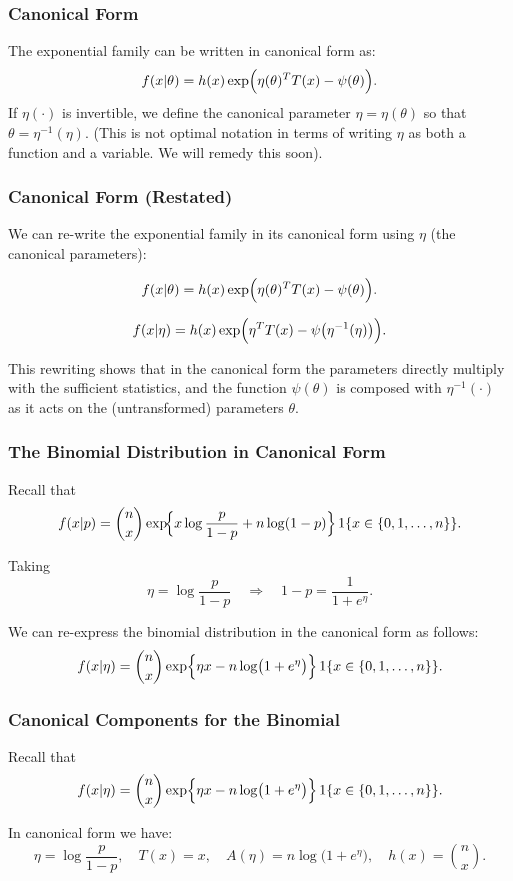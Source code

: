 \documentclass{beamer}
\begin{document}
\begin{frame}
\frametitle{Canonical Form}
The exponential family can be written in canonical form as:
\[
f(x|\theta) = h(x)\exp\Bigl(\eta(\theta)^T T(x) - \psi(\theta)\Bigr).
\]
If $\eta(\cdot)$ is invertible, we define the canonical parameter $\eta = \eta(\theta)$ so that $\theta = \eta^{-1}(\eta)$. (This is not optimal notation in terms of writing $\eta$ as both a function and a variable. We will remedy this soon). 

\end{frame}

\begin{frame}
\frametitle{Canonical Form (Restated)}

We can re-write the exponential family in its canonical form using $\eta$ (the canonical parameters):

\[
f(x|\theta) = h(x)\exp\Bigl(\eta(\theta)^T T(x) - \psi(\theta)\Bigr).
\]

\[
f(x|\eta) = h(x)\exp\Bigl(\eta^T T(x) - \psi\bigl(\eta^{-1}(\eta)\bigr)\Bigr).
\]


This rewriting shows that in the canonical form the parameters directly multiply with the sufficient statistics, and the function $\psi(\theta)$ is composed with $\eta^{-1}(\cdot)$ as it acts on the (untransformed) parameters $\theta$.
\end{frame}

\begin{frame}
\frametitle{The Binomial Distribution in Canonical Form}
Recall that
\[
f(x|p) = \binom{n}{x}\exp\!\Bigl\{x\log\frac{p}{1-p}+n\log(1-p)\Bigr\}\, 1\{x \in \{0,1,\dots,n\}\}.
\]

Taking 
\[
\eta = \log\frac{p}{1-p} \quad \Longrightarrow \quad 1-p = \frac{1}{1+e^\eta}.
\]

We can re-express the binomial distribution in the canonical form as follows:
\[
f(x|\eta) = \binom{n}{x}\exp\Bigl\{\eta x - n\log\bigl(1+e^\eta\bigr)\Bigr\}\, 1\{x \in \{0,1,\dots,n\}\}.
\]
\end{frame}

\begin{frame}
\frametitle{Canonical Components for the Binomial}

Recall that 
\[
f(x|\eta) = \binom{n}{x}\exp\Bigl\{\eta x - n\log\bigl(1+e^\eta\bigr)\Bigr\}\, 1\{x \in \{0,1,\dots,n\}\}.
\]

In canonical form we have:
\[
\eta = \log\frac{p}{1-p}, \quad T(x)=x,\quad A(\eta)= n\log\bigl(1+e^\eta\bigr),\quad h(x)= \binom{n}{x}.
\]
\end{frame}
\end{document}
